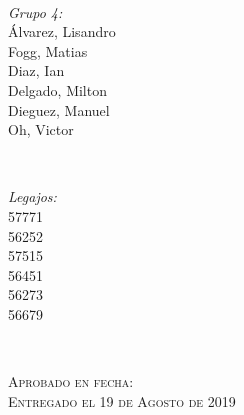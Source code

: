 \begin{titlepage}
\HRule \\[1.5cm]

 

\begin{minipage}{0.4\textwidth}
\begin{flushleft} \large
\emph{Grupo 4:}\\
Álvarez, Lisandro \\Fogg, Matias\\ Diaz, Ian\\Delgado, Milton\\Dieguez, Manuel\\Oh, Victor %
\end{flushleft}
\end{minipage}
~
\begin{minipage}{0.4\textwidth}
\begin{flushright} \large
\emph{Legajos:} \\
57771\\56252\\57515\\56451\\56273\\56679 
\end{flushright}
\end{minipage}\\[1cm]


 \begin{flushleft}
\textsc{\large Aprobado en fecha:  \dotfill}\\[0.5cm] 



\textsc{\large Entregado el 19 de Agosto de 2019}\\
 \end{flushleft}


\vfill %

\end{titlepage}


%
